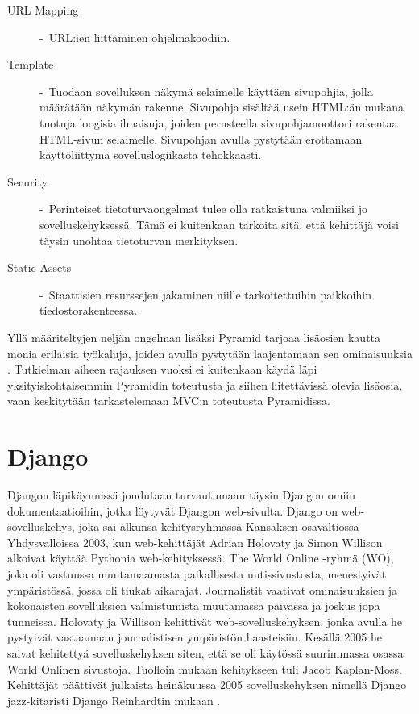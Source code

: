 \documentclass[utf8]{gradu3}
\begin{document}
\begin{description}
\item [URL Mapping] -\ URL:ien liittäminen ohjelmakoodiin.
\item[Template] -\ Tuodaan sovelluksen näkymä selaimelle käyttäen sivupohjia, jolla määrätään näkymän rakenne. Sivupohja sisältää usein HTML:än mukana tuotuja loogisia ilmaisuja, joiden perusteella sivupohjamoottori rakentaa HTML-sivun selaimelle. Sivupohjan avulla pystytään erottamaan käyttöliittymä sovelluslogiikasta tehokkaasti.
\item[Security] -\ Perinteiset tietoturvaongelmat tulee olla ratkaistuna valmiiksi jo sovelluskehyksessä. Tämä ei kuitenkaan tarkoita sitä, että kehittäjä voisi täysin unohtaa tietoturvan merkityksen.
\item[Static Assets] -\ Staattisien resurssejen jakaminen niille tarkoitettuihin paikkoihin tiedostorakenteessa.
\end{description}
Yllä määriteltyjen neljän ongelman lisäksi Pyramid tarjoaa lisäosien kautta monia erilaisia työkaluja, joiden avulla pystytään laajentamaan sen ominaisuuksia \parencite{pyramid_intr}. Tutkielman aiheen rajauksen vuoksi ei kuitenkaan
käydä läpi yksityiskohtaisemmin Pyramidin toteutusta ja siihen liitettävissä olevia lisäosia, vaan keskitytään tarkastelemaan MVC:n toteutusta Pyramidissa.

\section{Django}
Djangon läpikäynnissä joudutaan turvautumaan täysin Djangon omiin dokumentaatioihin, jotka löytyvät Djangon web-sivulta. Django on web-sovelluskehys, joka  sai alkunsa kehitysryhmässä Kansaksen osavaltiossa Yhdysvalloissa 2003, kun web-kehittäjät Adrian Holovaty ja Simon Willison alkoivat käyttää Pythonia web-kehityksessä. The World Online -ryhmä (WO), joka oli vastuussa muutamaamasta paikallisesta uutissivustosta, menestyivät ympäristössä, jossa oli tiukat aikarajat. Journalistit vaativat ominaisuuksien ja kokonaisten sovelluksien valmistumista muutamassa päivässä ja joskus jopa tunneissa. Holovaty ja Willison kehittivät web-sovelluskehyksen, jonka avulla he pystyivät vastaamaan journalistisen ympäristön haasteisiin. Kesällä 2005 he saivat kehitettyä sovelluskehyksen siten, että se oli käytössä suurimmassa osassa World Onlinen sivustoja. Tuolloin mukaan kehitykseen tuli Jacob Kaplan-Moss. Kehittäjät päättivät julkaista heinäkuussa 2005 sovelluskehyksen nimellä Django jazz-kitaristi Django Reinhardtin mukaan \parencite{django_history}.
\end{document}
